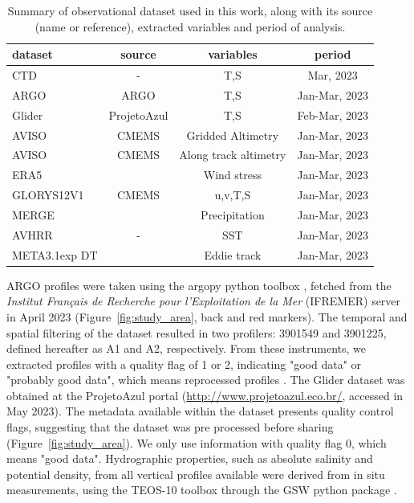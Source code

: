 \documentclass[draft]{agujournal2019}
\begin{document}
\begin{table}
\caption{Summary of observational dataset used in this work, along with its source (name or reference), extracted variables and period of analysis.}
\centering
\begin{tabular}{l c c c}
\hline
 \textbf{dataset} & \textbf{source} & \textbf{variables} & \textbf{period} \\
\hline
        CTD           & - & T,S & Mar, 2023 \\ 
        ARGO          & ARGO & T,S & Jan-Mar, 2023 \\ 
        Glider        & ProjetoAzul & T,S & Feb-Mar, 2023 \\ 
        AVISO         & CMEMS & Gridded Altimetry & Jan-Mar, 2023 \\ 
        AVISO         & CMEMS & Along track altimetry & Jan-Mar, 2023 \\ 
        ERA5          & \cite{hersbach2018era5} & Wind stress & Jan-Mar, 2023 \\ 
        GLORYS12V1    & CMEMS & u,v,T,S & Jan-Mar, 2023 \\ 
        MERGE         & \cite{rozante2010combining} & Precipitation & Jan-Mar, 2023 \\ 
        AVHRR         & - & SST & Jan-Mar, 2023 \\ 
        META3.1exp DT & \cite{pegliasco2022} & Eddie track & Jan-Mar, 2023 \\ 
\hline
\end{tabular}
\end{table}

ARGO profiles were taken using the argopy python toolbox \cite{Maze2020}, fetched from the \textit{Institut Français de Recherche pour l’Exploitation de la Mer} (IFREMER) server in April 2023 (Figure~\ref{fig:study_area}, back and red markers). The temporal and spatial filtering of the dataset resulted in two profilers: 3901549 and 3901225, defined hereafter as A1 and A2, respectively. From these instruments, we extracted profiles with a quality flag of 1 or 2, indicating "good data" or "probably good data", which means reprocessed profiles \cite{notarstefano2020argo}. The Glider dataset was obtained at the ProjetoAzul portal (\url{http://www.projetoazul.eco.br/}, accessed in May 2023). The metadata available within the dataset presents quality control flags, suggesting that the dataset was pre processed before sharing (Figure~\ref{fig:study_area}). We only use information with quality flag 0, which means "good data". Hydrographic properties, such as absolute salinity and potential density, from all vertical profiles available were derived from in situ measurements, using the TEOS-10 toolbox \cite{mcdougall2011gsw} through the GSW python package \cite{firing2021gsw}. 
\end{document}
